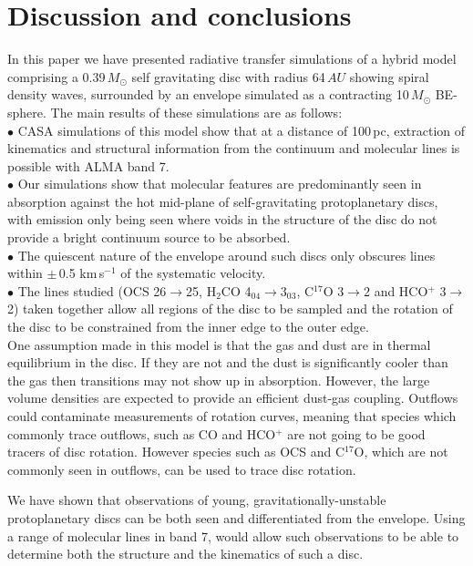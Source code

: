 \documentclass[useAMS,usenatbib]{mn2e}
\begin{document}
\section{Discussion and conclusions} \label{sec:discussion}

In this paper we have presented radiative transfer simulations of a hybrid model comprising a 0.39$\, M_\odot$ self gravitating disc with radius 64$\,AU$ showing spiral density waves, surrounded by an envelope simulated as a contracting 10$\,M_\odot$ BE-sphere. The main results of these simulations are as follows:\\
$\bullet$ CASA simulations of this model show that at a distance of 100$\,$pc, extraction of kinematics and structural information from the continuum and molecular lines is possible with ALMA band 7.\\
$\bullet$ Our simulations show that molecular features are predominantly seen in absorption against the hot mid-plane of self-gravitating protoplanetary discs, with emission only being seen where voids in the structure of the disc do not provide a bright continuum source to be absorbed.\\
$\bullet$ The quiescent nature of the envelope around such discs only obscures lines within $\pm\,$0.5 km$\,$s$^{-1}$ of the systematic velocity.\\
$\bullet$ The lines studied (OCS 26$\rightarrow$25, H$_2$CO 4$_{04}$$\rightarrow$3$_{03}$, C$^{17}$O 3$\rightarrow$2 and HCO$^+$ 3$\rightarrow$2) taken together allow all regions of the disc to be sampled and the rotation of the disc to be constrained from the inner edge to the outer edge.\\


One assumption made in this model is that the gas and dust are in thermal equilibrium in the disc. If they are not and the dust is significantly cooler than the gas then transitions may not show up in absorption. However, the large volume densities are expected to provide an efficient dust-gas coupling.\newline
Outflows could contaminate measurements of rotation curves, meaning that species  which commonly trace outflows, such as CO and HCO$^+$ are not going to be good tracers of disc rotation. However species such as OCS and C$^{17}$O, which are not commonly seen in outflows, can be used to trace disc rotation.\newline

We have shown that observations of young, gravitationally-unstable protoplanetary discs can be both seen and differentiated from the envelope. Using a range of molecular lines in band 7, would allow such observations to be able to determine both the structure and the kinematics of such a disc.
\end{document}
